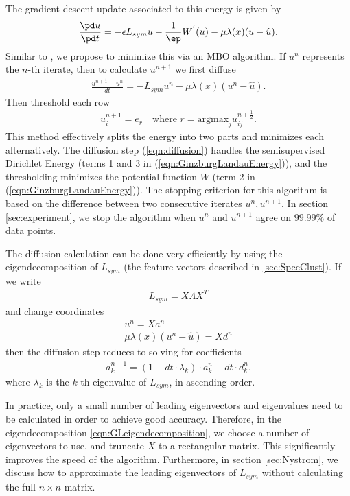 \documentclass[journal]{IEEEtran}
\begin{document}
The gradient descent update associated to this energy is given by
\begin{align}
  \frac{\pd u}{\pd t} = -\epsilon L_{sym} u - \frac{1}{\ep}W^{'}(u) - \mu\lambda(x)(u-\hat{u}).
\end{align}
Similar to \cite{Merkurjev13,Garcia2014,Meng17}, we propose to minimize this via
an MBO algorithm. If $u^{n}$ represents the $n$-th iterate, then to calculate
$u^{n+1}$ we first diffuse
\begin{align}\label{eqn:diffusion}
  \frac{u^{n+\frac{1}{2}}-u^n}{dt} = -L_{sym} u^n - \mu \lambda(x) (u^n - \hat{u}).
\end{align}
Then threshold each row
\begin{align}\label{eqn:threshold}
  u_i^{n+1} = e_r \quad \text{where }r = \text{argmax}_ju_{ij}^{n+\frac{1}{2}}.
\end{align}
This method effectively splits the energy into two parts and minimizes each
alternatively. The diffusion step (\ref{eqn:diffusion}) handles the
semisupervised Dirichlet Energy (terms 1 and 3 in
(\ref{eqn:GinzburgLandauEnergy})), and the thresholding minimizes the potential
function $W$ (term 2 in (\ref{eqn:GinzburgLandauEnergy})). The stopping
criterion for this algorithm is based on the difference between two consecutive
iterates $u^n,u^{n+1}$. In section \ref{sec:experiment}, we stop the algorithm
when $u^n$ and $u^{n+1}$ agree on 99.99\% of data points.

The diffusion calculation can be done very efficiently by using the
eigendecomposition of $L_{sym}$ (the feature vectors described in
\ref{sec:SpecClust}). If we write
\begin{align}\label{eqn:GLeigendecomposition}
  L_{sym} = X\Lambda X^T
\end{align}
and change coordinates
\begin{align}
  u^n = Xa^n \\
  \mu \lambda(x)(u^n - \hat{u}) = Xd^n
\end{align}
then the diffusion step reduces to solving for coefficients
\begin{align}
  a_k^{n+1} = (1 - dt \cdot \lambda_k)\cdot a_k^n - dt\cdot d_k^n.
\end{align}
where $\lambda_k$ is the $k$-th eigenvalue of $L_{sym}$, in ascending order.

In practice, only a small number of leading eigenvectors and eigenvalues need to
be calculated in order to achieve good accuracy. Therefore, in the
eigendecomposition \ref{eqn:GLeigendecomposition}, we choose a number of
eigenvectors to use, and truncate $X$ to a rectangular matrix. This
significantly improves the speed of the algorithm. Furthermore, in section
\ref{sec:Nystrom}, we discuss how to approximate the leading eigenvectors of
$L_{sym}$ without calculating the full $n \times n$ matrix.
\end{document}
